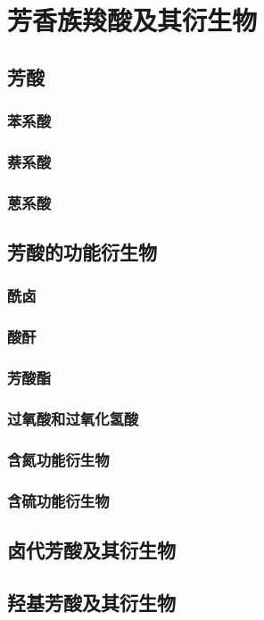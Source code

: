 \documentclass[UTF8]{../03-Chemistry}
\begin{document}
\section{芳香族羧酸及其衍生物}
    \subsection{芳酸}
        \subsubsection{苯系酸}
        \subsubsection{萘系酸}
        \subsubsection{蒽系酸}
    \subsection{芳酸的功能衍生物}
        \subsubsection{酰卤}
        \subsubsection{酸酐}
        \subsubsection{芳酸酯}
        \subsubsection{过氧酸和过氧化氢酸}
        \subsubsection{含氮功能衍生物}
        \subsubsection{含硫功能衍生物}
    \subsection{卤代芳酸及其衍生物}
    \subsection{羟基芳酸及其衍生物}
\end{document}
